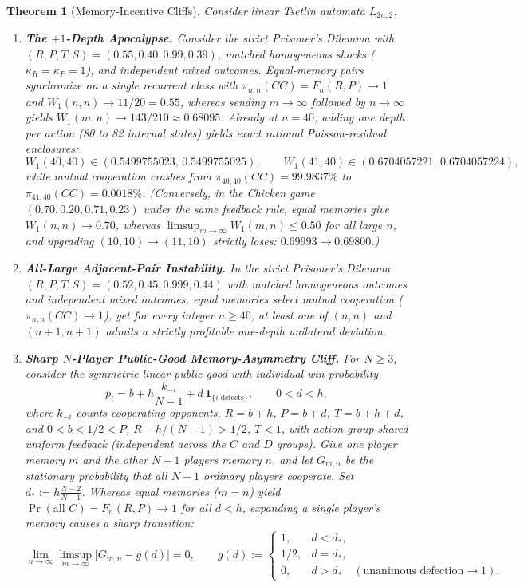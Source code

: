 \documentclass[11pt,reqno]{amsart}
\newtheorem{theorem}{Theorem}[section]
\theoremstyle{definition}
\theoremstyle{remark}
\newcommand{\one}{\mathbf{1}}
\begin{document}
\begin{theorem}[Memory-Incentive Cliffs]\label{thm:memory-cliffs}
Consider linear Tsetlin automata $L_{2n,2}$.
\begin{enumerate}
  \item \textbf{The $+1$-Depth Apocalypse.} Consider the strict Prisoner's Dilemma with $(R, P, T, S) = (0.55, 0.40, 0.99, 0.39)$, matched homogeneous shocks ($\kappa_R = \kappa_P = 1$), and independent mixed outcomes. Equal-memory pairs synchronize on a single recurrent class with $\pi_{n,n}(CC) = F_n(R,P) \to 1$ and $W_1(n,n) \to 11/20 = 0.55$, whereas sending $m \to \infty$ followed by $n \to \infty$ yields $W_1(m,n) \to 143/210 \approx 0.68095$. Already at $n = 40$, adding one depth per action (80 to 82 internal states) yields exact rational Poisson-residual enclosures:
  \[
    W_1(40,40) \in (0.5499755023,\, 0.5499755025), \qquad
    W_1(41,40) \in (0.6704057221,\, 0.6704057224),
  \]
  while mutual cooperation crashes from $\pi_{40,40}(CC) = 99.9837\%$ to $\pi_{41,40}(CC) = 0.0018\%$. (Conversely, in the Chicken game $(0.70, 0.20, 0.71, 0.23)$ under the same feedback rule, equal memories give $W_1(n,n)\to 0.70$, whereas $\limsup_{m\to\infty} W_1(m,n) \le 0.50$ for all large $n$, and upgrading $(10,10)\to(11,10)$ strictly loses: $0.69993 \to 0.69800$.)

  \item \textbf{All-Large Adjacent-Pair Instability.} In the strict Prisoner's Dilemma $(R,P,T,S) = (0.52, 0.45, 0.999, 0.44)$ with matched homogeneous outcomes and independent mixed outcomes, equal memories select mutual cooperation ($\pi_{n,n}(CC) \to 1$), yet for \emph{every integer $n \ge 40$}, at least one of $(n,n)$ and $(n+1,n+1)$ admits a strictly profitable one-depth unilateral deviation.

  \item \textbf{Sharp $N$-Player Public-Good Memory-Asymmetry Cliff.} For $N \ge 3$, consider the symmetric linear public good with individual win probability
  \[
    p_i = b + h\frac{k_{-i}}{N-1} + d\,\one_{\{i \text{ defects}\}}, \qquad 0 < d < h,
  \]
  where $k_{-i}$ counts cooperating opponents, $R = b+h$, $P = b+d$, $T = b+h+d$, and $0 < b < 1/2 < P$, $R - h/(N-1) > 1/2$, $T < 1$, with action-group-shared uniform feedback (independent across the $C$ and $D$ groups). Give one player memory $m$ and the other $N-1$ players memory $n$, and let $G_{m,n}$ be the stationary probability that all $N-1$ ordinary players cooperate. Set $d_* := h\frac{N-2}{N-1}$. Whereas equal memories ($m=n$) yield $\Pr(\text{all }C) = F_n(R,P) \to 1$ for all $d < h$, expanding a single player's memory causes a sharp transition:
  \begin{equation}\label{eq:n-player-cliff}
    \lim_{n\to\infty}\limsup_{m\to\infty}\bigl|G_{m,n} - g(d)\bigr| = 0, \qquad
    g(d) :=
    \begin{cases}
      1, & d < d_*,\\
      1/2, & d = d_*,\\
      0, & d > d_* \quad (\text{unanimous defection} \to 1).
    \end{cases}
  \end{equation}
\end{enumerate}
\end{theorem}
\end{document}
